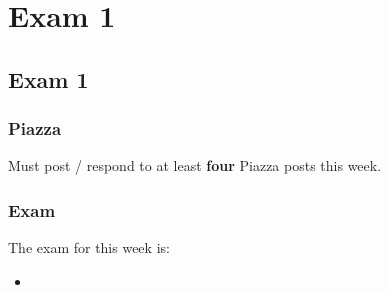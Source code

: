 \clearpage

\renewcommand{\ChapTitle}{Exam 1}
\renewcommand{\SectionTitle}{Exam 1}

\chapter{\ChapTitle}
\section{\SectionTitle}

\subsection{Piazza}

Must post / respond to at least \textbf{four} Piazza posts this week.

\subsection{Exam}

The exam for this week is: 

\begin{itemize}
    \item {}
\end{itemize}
